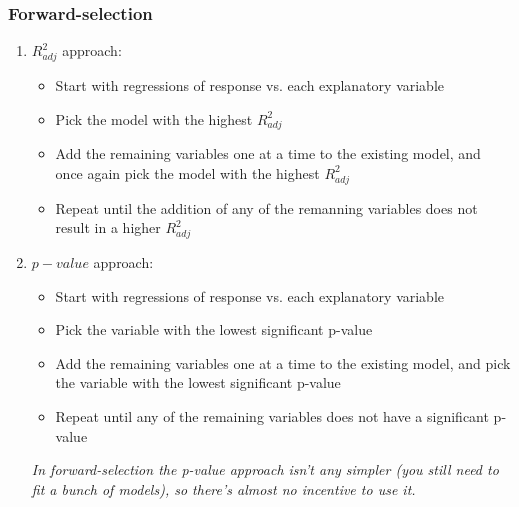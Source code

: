 
\begin{frame}
\frametitle{Forward-selection}

\begin{enumerate}

\item $R^2_{adj}$ approach: 
\begin{itemize}
\item Start with regressions of response vs. each explanatory variable
\item Pick the model with the highest $R^2_{adj}$
\item Add the remaining variables one at a time to the existing model, and once again pick the model  with the highest $R^2_{adj}$
\item Repeat until the addition of any of the remanning variables does not result in a higher $R^2_{adj}$
\end{itemize}

\item $p-value$ approach: 
\begin{itemize}
\item Start with regressions of response vs. each explanatory variable
\item Pick the variable with the lowest significant p-value 
\item Add the remaining variables one at a time to the existing model, and pick the variable with the lowest significant p-value
\item Repeat until any of the remaining variables does not have a significant p-value
\end{itemize}

\textit{In forward-selection the p-value approach isn't any simpler (you still need to fit a bunch of models), so there's almost no incentive to use it.}

\end{enumerate}

\end{frame}



